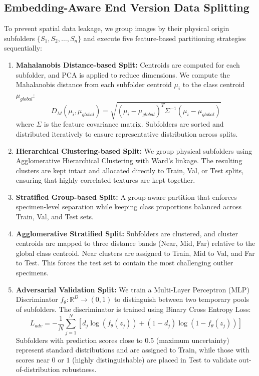 \documentclass[journal,onecolumn]{IEEEtran}
\begin{document}
\subsection{Embedding-Aware End Version Data Splitting}
To prevent spatial data leakage, we group images by their physical origin subfolders $\{S_1, S_2, \dots, S_n\}$ and execute five feature-based partitioning strategies sequentially:
\begin{enumerate}
    \item \textbf{Mahalanobis Distance-based Split:} Centroids are computed for each subfolder, and PCA is applied to reduce dimensions. We compute the Mahalanobis distance from each subfolder centroid $\mu_i$ to the class centroid $\mu_{global}$:
    \begin{equation}
    D_M(\mu_i, \mu_{global}) = \sqrt{(\mu_i - \mu_{global})^T \Sigma^{-1} (\mu_i - \mu_{global})}
    \end{equation}
    where $\Sigma$ is the feature covariance matrix. Subfolders are sorted and distributed iteratively to ensure representative distribution across splits.
    \item \textbf{Hierarchical Clustering-based Split:} We group physical subfolders using Agglomerative Hierarchical Clustering with Ward's linkage. The resulting clusters are kept intact and allocated directly to Train, Val, or Test splits, ensuring that highly correlated textures are kept together.
    \item \textbf{Stratified Group-based Split:} A group-aware partition that enforces specimen-level separation while keeping class proportions balanced across Train, Val, and Test sets.
    \item \textbf{Agglomerative Stratified Split:} Subfolders are clustered, and cluster centroids are mapped to three distance bands (Near, Mid, Far) relative to the global class centroid. Near clusters are assigned to Train, Mid to Val, and Far to Test. This forces the test set to contain the most challenging outlier specimens.
    \item \textbf{Adversarial Validation Split:} We train a Multi-Layer Perceptron (MLP) Discriminator $f_{\theta}: \mathbb{R}^D \to (0, 1)$ to distinguish between two temporary pools of subfolders. The discriminator is trained using Binary Cross Entropy Loss:
    \begin{equation}
    L_{adv} = - \frac{1}{N} \sum_{j=1}^N \left[ d_j \log(f_{\theta}(z_j)) + (1 - d_j) \log(1 - f_{\theta}(z_j)) \right]
    \end{equation}
    Subfolders with prediction scores close to $0.5$ (maximum uncertainty) represent standard distributions and are assigned to Train, while those with scores near $0$ or $1$ (highly distinguishable) are placed in Test to validate out-of-distribution robustness.
\end{enumerate}
\end{document}
